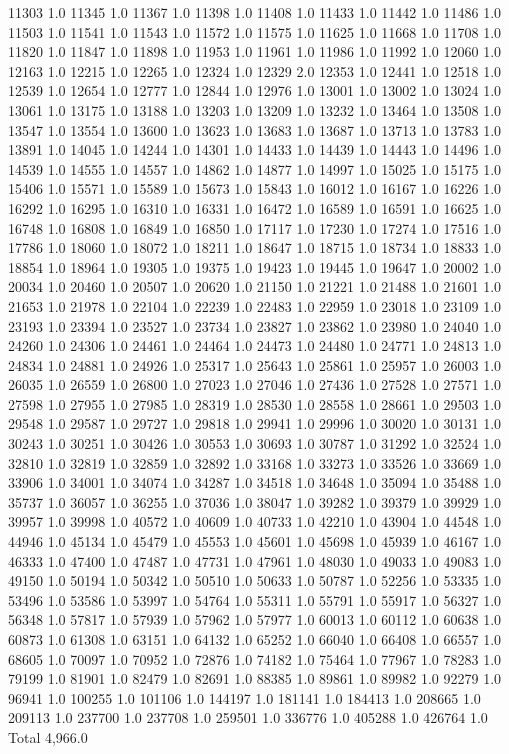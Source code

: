11303	1.0
11345	1.0
11367	1.0
11398	1.0
11408	1.0
11433	1.0
11442	1.0
11486	1.0
11503	1.0
11541	1.0
11543	1.0
11572	1.0
11575	1.0
11625	1.0
11668	1.0
11708	1.0
11820	1.0
11847	1.0
11898	1.0
11953	1.0
11961	1.0
11986	1.0
11992	1.0
12060	1.0
12163	1.0
12215	1.0
12265	1.0
12324	1.0
12329	2.0
12353	1.0
12441	1.0
12518	1.0
12539	1.0
12654	1.0
12777	1.0
12844	1.0
12976	1.0
13001	1.0
13002	1.0
13024	1.0
13061	1.0
13175	1.0
13188	1.0
13203	1.0
13209	1.0
13232	1.0
13464	1.0
13508	1.0
13547	1.0
13554	1.0
13600	1.0
13623	1.0
13683	1.0
13687	1.0
13713	1.0
13783	1.0
13891	1.0
14045	1.0
14244	1.0
14301	1.0
14433	1.0
14439	1.0
14443	1.0
14496	1.0
14539	1.0
14555	1.0
14557	1.0
14862	1.0
14877	1.0
14997	1.0
15025	1.0
15175	1.0
15406	1.0
15571	1.0
15589	1.0
15673	1.0
15843	1.0
16012	1.0
16167	1.0
16226	1.0
16292	1.0
16295	1.0
16310	1.0
16331	1.0
16472	1.0
16589	1.0
16591	1.0
16625	1.0
16748	1.0
16808	1.0
16849	1.0
16850	1.0
17117	1.0
17230	1.0
17274	1.0
17516	1.0
17786	1.0
18060	1.0
18072	1.0
18211	1.0
18647	1.0
18715	1.0
18734	1.0
18833	1.0
18854	1.0
18964	1.0
19305	1.0
19375	1.0
19423	1.0
19445	1.0
19647	1.0
20002	1.0
20034	1.0
20460	1.0
20507	1.0
20620	1.0
21150	1.0
21221	1.0
21488	1.0
21601	1.0
21653	1.0
21978	1.0
22104	1.0
22239	1.0
22483	1.0
22959	1.0
23018	1.0
23109	1.0
23193	1.0
23394	1.0
23527	1.0
23734	1.0
23827	1.0
23862	1.0
23980	1.0
24040	1.0
24260	1.0
24306	1.0
24461	1.0
24464	1.0
24473	1.0
24480	1.0
24771	1.0
24813	1.0
24834	1.0
24881	1.0
24926	1.0
25317	1.0
25643	1.0
25861	1.0
25957	1.0
26003	1.0
26035	1.0
26559	1.0
26800	1.0
27023	1.0
27046	1.0
27436	1.0
27528	1.0
27571	1.0
27598	1.0
27955	1.0
27985	1.0
28319	1.0
28530	1.0
28558	1.0
28661	1.0
29503	1.0
29548	1.0
29587	1.0
29727	1.0
29818	1.0
29941	1.0
29996	1.0
30020	1.0
30131	1.0
30243	1.0
30251	1.0
30426	1.0
30553	1.0
30693	1.0
30787	1.0
31292	1.0
32524	1.0
32810	1.0
32819	1.0
32859	1.0
32892	1.0
33168	1.0
33273	1.0
33526	1.0
33669	1.0
33906	1.0
34001	1.0
34074	1.0
34287	1.0
34518	1.0
34648	1.0
35094	1.0
35488	1.0
35737	1.0
36057	1.0
36255	1.0
37036	1.0
38047	1.0
39282	1.0
39379	1.0
39929	1.0
39957	1.0
39998	1.0
40572	1.0
40609	1.0
40733	1.0
42210	1.0
43904	1.0
44548	1.0
44946	1.0
45134	1.0
45479	1.0
45553	1.0
45601	1.0
45698	1.0
45939	1.0
46167	1.0
46333	1.0
47400	1.0
47487	1.0
47731	1.0
47961	1.0
48030	1.0
49033	1.0
49083	1.0
49150	1.0
50194	1.0
50342	1.0
50510	1.0
50633	1.0
50787	1.0
52256	1.0
53335	1.0
53496	1.0
53586	1.0
53997	1.0
54764	1.0
55311	1.0
55791	1.0
55917	1.0
56327	1.0
56348	1.0
57817	1.0
57939	1.0
57962	1.0
57977	1.0
60013	1.0
60112	1.0
60638	1.0
60873	1.0
61308	1.0
63151	1.0
64132	1.0
65252	1.0
66040	1.0
66408	1.0
66557	1.0
68605	1.0
70097	1.0
70952	1.0
72876	1.0
74182	1.0
75464	1.0
77967	1.0
78283	1.0
79199	1.0
81901	1.0
82479	1.0
82691	1.0
88385	1.0
89861	1.0
89982	1.0
92279	1.0
96941	1.0
100255	1.0
101106	1.0
144197	1.0
181141	1.0
184413	1.0
208665	1.0
209113	1.0
237700	1.0
237708	1.0
259501	1.0
336776	1.0
405288	1.0
426764	1.0
Total	4,966.0

